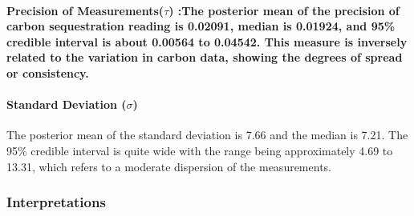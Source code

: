 \documentclass[
]{article}
\begin{document}
\paragraph{\texorpdfstring{Precision of Measurements(\(\tau\)) :The
posterior mean of the precision of carbon sequestration reading is
0.02091, median is 0.01924, and 95\% credible interval is about 0.00564
to 0.04542. This measure is inversely related to the variation in carbon
data, showing the degrees of spread or
consistency.}{Precision of Measurements(\textbackslash tau) :The posterior mean of the precision of carbon sequestration reading is 0.02091, median is 0.01924, and 95\% credible interval is about 0.00564 to 0.04542. This measure is inversely related to the variation in carbon data, showing the degrees of spread or consistency.}}\label{precision-of-measurementstau-the-posterior-mean-of-the-precision-of-carbon-sequestration-reading-is-0.02091-median-is-0.01924-and-95-credible-interval-is-about-0.00564-to-0.04542.-this-measure-is-inversely-related-to-the-variation-in-carbon-data-showing-the-degrees-of-spread-or-consistency.}

\paragraph{\texorpdfstring{Standard Deviation
(\(\sigma\))}{Standard Deviation (\textbackslash sigma)}}\label{standard-deviation-sigma}

The posterior mean of the standard deviation is 7.66 and the median is
7.21. The 95\% credible interval is quite wide with the range being
approximately 4.69 to 13.31, which refers to a moderate dispersion of
the measurements.

\subsubsection{Interpretations}\label{interpretations}
\end{document}
